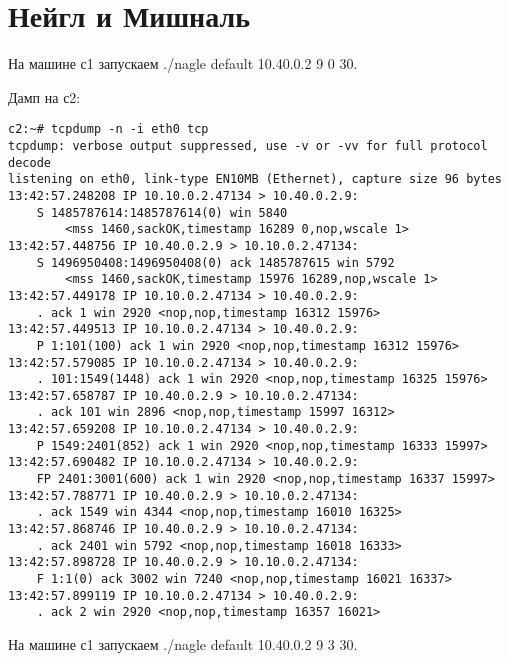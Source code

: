 \documentclass[a4paper,12pt]{article}
\begin{document}
\section{Нейгл и Мишналь}

На машине с1 запускаем ./nagle default 10.40.0.2 9 0 30.

Дамп на с2:
\begin{Verbatim}
c2:~# tcpdump -n -i eth0 tcp
tcpdump: verbose output suppressed, use -v or -vv for full protocol decode
listening on eth0, link-type EN10MB (Ethernet), capture size 96 bytes
13:42:57.248208 IP 10.10.0.2.47134 > 10.40.0.2.9: 
    S 1485787614:1485787614(0) win 5840 
        <mss 1460,sackOK,timestamp 16289 0,nop,wscale 1>
13:42:57.448756 IP 10.40.0.2.9 > 10.10.0.2.47134: 
    S 1496950408:1496950408(0) ack 1485787615 win 5792 
        <mss 1460,sackOK,timestamp 15976 16289,nop,wscale 1>
13:42:57.449178 IP 10.10.0.2.47134 > 10.40.0.2.9: 
    . ack 1 win 2920 <nop,nop,timestamp 16312 15976>
13:42:57.449513 IP 10.10.0.2.47134 > 10.40.0.2.9: 
    P 1:101(100) ack 1 win 2920 <nop,nop,timestamp 16312 15976>
13:42:57.579085 IP 10.10.0.2.47134 > 10.40.0.2.9: 
    . 101:1549(1448) ack 1 win 2920 <nop,nop,timestamp 16325 15976>
13:42:57.658787 IP 10.40.0.2.9 > 10.10.0.2.47134: 
    . ack 101 win 2896 <nop,nop,timestamp 15997 16312>
13:42:57.659208 IP 10.10.0.2.47134 > 10.40.0.2.9: 
    P 1549:2401(852) ack 1 win 2920 <nop,nop,timestamp 16333 15997>
13:42:57.690482 IP 10.10.0.2.47134 > 10.40.0.2.9: 
    FP 2401:3001(600) ack 1 win 2920 <nop,nop,timestamp 16337 15997>
13:42:57.788771 IP 10.40.0.2.9 > 10.10.0.2.47134: 
    . ack 1549 win 4344 <nop,nop,timestamp 16010 16325>
13:42:57.868746 IP 10.40.0.2.9 > 10.10.0.2.47134: 
    . ack 2401 win 5792 <nop,nop,timestamp 16018 16333>
13:42:57.898728 IP 10.40.0.2.9 > 10.10.0.2.47134: 
    F 1:1(0) ack 3002 win 7240 <nop,nop,timestamp 16021 16337>
13:42:57.899119 IP 10.10.0.2.47134 > 10.40.0.2.9: 
    . ack 2 win 2920 <nop,nop,timestamp 16357 16021>
\end{Verbatim}

На машине с1 запускаем ./nagle default 10.40.0.2 9 3 30.
\end{document}
